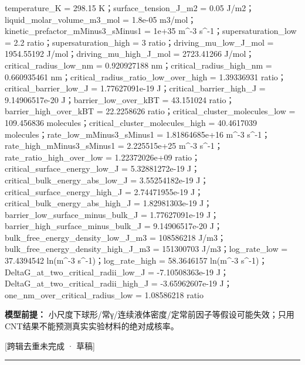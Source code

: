 \documentclass[UTF8,11pt,a4paper]{ctexart}
\begin{document}
temperature\_K = 298.15 K；surface\_tension\_J\_m2 = 0.05 J/m2；liquid\_molar\_volume\_m3\_mol = 1.8e-05 m3/mol；kinetic\_prefactor\_mMinus3\_sMinus1 = 1e+35 m\textasciicircum{}-3 s\textasciicircum{}-1；supersaturation\_low = 2.2 ratio；supersaturation\_high = 3 ratio；driving\_mu\_low\_J\_mol = 1954.55192 J/mol；driving\_mu\_high\_J\_mol = 2723.41266 J/mol；critical\_radius\_low\_nm = 0.920927188 nm；critical\_radius\_high\_nm = 0.660935461 nm；critical\_radius\_ratio\_low\_over\_high = 1.39336931 ratio；critical\_barrier\_low\_J = 1.77627091e-19 J；critical\_barrier\_high\_J = 9.14906517e-20 J；barrier\_low\_over\_kBT = 43.151024 ratio；barrier\_high\_over\_kBT = 22.2258626 ratio；critical\_cluster\_molecules\_low = 109.456836 molecules；critical\_cluster\_molecules\_high = 40.4617039 molecules；rate\_low\_mMinus3\_sMinus1 = 1.81864685e+16 m\textasciicircum{}-3 s\textasciicircum{}-1；rate\_high\_mMinus3\_sMinus1 = 2.225515e+25 m\textasciicircum{}-3 s\textasciicircum{}-1；rate\_ratio\_high\_over\_low = 1.22372026e+09 ratio；critical\_surface\_energy\_low\_J = 5.32881272e-19 J；critical\_bulk\_energy\_abs\_low\_J = 3.55254182e-19 J；critical\_surface\_energy\_high\_J = 2.74471955e-19 J；critical\_bulk\_energy\_abs\_high\_J = 1.82981303e-19 J；barrier\_low\_surface\_minus\_bulk\_J = 1.77627091e-19 J；barrier\_high\_surface\_minus\_bulk\_J = 9.14906517e-20 J；bulk\_free\_energy\_density\_low\_J\_m3 = 108586218 J/m3；bulk\_free\_energy\_density\_high\_J\_m3 = 151300703 J/m3；log\_rate\_low = 37.4394542 ln(m\textasciicircum{}-3 s\textasciicircum{}-1)；log\_rate\_high = 58.3646157 ln(m\textasciicircum{}-3 s\textasciicircum{}-1)；DeltaG\_at\_two\_critical\_radii\_low\_J = -7.10508363e-19 J；DeltaG\_at\_two\_critical\_radii\_high\_J = -3.65962607e-19 J；one\_nm\_over\_critical\_radius\_low = 1.08586218 ratio\par
\noindent\textbf{模型前提：}
小尺度下球形/常γ/连续液体密度/定常前因子等假设可能失效；只用CNT结果不能预测真实实验材料的绝对成核率。\par
\noindent\textcolor{red!65!black}{[跨辑去重未完成 · 草稿]} \par
\medskip\hrule\medskip
{}
\end{document}
